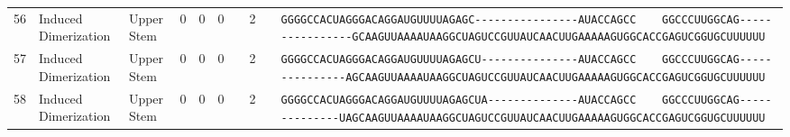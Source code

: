 \begin{tabular}{rllrrrrrcl}
 56 & Induced Dimerization & Upper Stem & 0 & 0 & 0 &  & 2 &  &
 \color{ucsfdarkgrey}\verb|GGGGCCACUAGGGACAGGAU|\color{ucsforange}\verb|GUUUUA|\color{ucsfblue}\verb|GAGC----------------|\color{ucsfpurple}\verb|AUACCAGCC    GGCCCUUGGCAG|\color{ucsfblue}\verb|----------------GCAAGU|\color{ucsforange}\verb|UAAAAUAA|\color{ucsfnavy}\verb|GGCUAGUCC|\color{ucsforange}\verb|GUUAUCA|\color{ucsfteal}\verb|ACUUGAAAAAGU|\color{ucsforange}\verb|GGCACCGAGUCGGUGCUUUUUU| \\

 57 & Induced Dimerization & Upper Stem & 0 & 0 & 0 &  & 2 &  &
 \color{ucsfdarkgrey}\verb|GGGGCCACUAGGGACAGGAU|\color{ucsforange}\verb|GUUUUA|\color{ucsfblue}\verb|GAGCU---------------|\color{ucsfpurple}\verb|AUACCAGCC    GGCCCUUGGCAG|\color{ucsfblue}\verb|---------------AGCAAGU|\color{ucsforange}\verb|UAAAAUAA|\color{ucsfnavy}\verb|GGCUAGUCC|\color{ucsforange}\verb|GUUAUCA|\color{ucsfteal}\verb|ACUUGAAAAAGU|\color{ucsforange}\verb|GGCACCGAGUCGGUGCUUUUUU| \\

 58 & Induced Dimerization & Upper Stem & 0 & 0 & 0 &  & 2 &  &
 \color{ucsfdarkgrey}\verb|GGGGCCACUAGGGACAGGAU|\color{ucsforange}\verb|GUUUUA|\color{ucsfblue}\verb|GAGCUA--------------|\color{ucsfpurple}\verb|AUACCAGCC    GGCCCUUGGCAG|\color{ucsfblue}\verb|--------------UAGCAAGU|\color{ucsforange}\verb|UAAAAUAA|\color{ucsfnavy}\verb|GGCUAGUCC|\color{ucsforange}\verb|GUUAUCA|\color{ucsfteal}\verb|ACUUGAAAAAGU|\color{ucsforange}\verb|GGCACCGAGUCGGUGCUUUUUU| \\

\bottomrule
\end{tabular}
